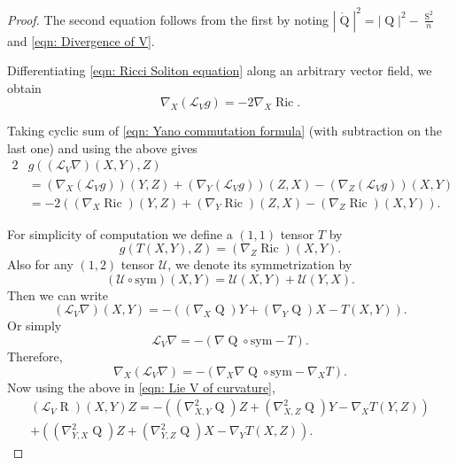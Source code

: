 \documentclass{amsart}
\newcommand{\abs}[1]{\left| #1 \right|}
\newcommand{\lie}[1]{\mathcal{L}_{#1}}
\DeclareMathOperator*{\ricci}{Ric}
\DeclareMathOperator*{\Qricci}{Q}
\DeclareMathOperator*{\scalar}{S}
\DeclareMathOperator*{\curvature}{R}
\theoremstyle{plain}
\theoremstyle{plain}
\theoremstyle{plain}
\theoremstyle{plain}
\theoremstyle{remark}
\begin{document}
\begin{proof}
The second equation follows from the first by noting $\abs{\mathring{\Qricci}}^2 = \abs{\Qricci}^2 - \frac{\scalar^2}{n} $ and \cref{eqn: Divergence of V}.

Differentiating \cref{eqn: Ricci Soliton equation} along an arbitrary vector field, we obtain 
\begin{equation*}
    \nabla_X \left( \lie{V} g \right) = - 2 \nabla_X \ricci.
\end{equation*}

Taking cyclic sum of \cref{eqn: Yano commutation formula} (with subtraction on the last one) and using the above gives
\begin{align*}
     2 & g\left( \left( \lie{V}\nabla  \right)  (X,Y), Z \right) \\
        &= \left( \nabla_X \left( \lie{V} g \right) \right) (Y,Z) + \left( \nabla_Y \left( \lie{V} g \right) \right) (Z,X)
            - \left( \nabla_Z \left( \lie{V} g \right) \right) (X,Y) \\
        &= -2 \left( \left( \nabla_X \ricci \right) (Y,Z) + \left( \nabla_Y \ricci \right) (Z,X) - \left( \nabla_Z \ricci \right) (X,Y) \right).
\end{align*}

For simplicity of computation we define a $(1,1)$ tensor $T$ by
\begin{equation*}
    g ( T(X,Y) , Z ) = (\nabla_Z \ricci ) (X,Y).
\end{equation*}
Also for any $(1,2)$ tensor $\mathcal{U}$, we denote its symmetrization by
\begin{equation*}  
 (\mathcal{U} \circ \mathrm{sym}  ) (X,Y) = \mathcal{U}(X,Y) + \mathcal{U}(Y,X).
\end{equation*} 
Then we can write
\begin{equation*}
	\left( \lie{V}\nabla \right) (X,Y) = - \left( (\nabla_X \Qricci ) Y + (\nabla_Y \Qricci) X - T (X,Y) \right).
\end{equation*}
Or simply
\begin{equation*}
	\lie{V}\nabla = - \left( \nabla\Qricci \circ \mathrm{sym} - T \right).
\end{equation*}
Therefore,
\begin{equation*}
    \nabla_X \left( \lie{V}\nabla \right) 
    		= - \left( \nabla_X \nabla\Qricci \circ \mathrm{sym} - \nabla_X T \right) .
\end{equation*}
Now using the above in \cref{eqn: Lie V of curvature},
\begin{multline*}
    (\lie{V}\curvature) (X,Y) Z = 
        - \left( \left( \nabla^2_{X,Y}\Qricci \right) Z 
        + \left( \nabla^2_{X,Z}\Qricci \right) Y - \nabla_X T (Y,Z)  \right) \\
        + \left( \left( \nabla^2_{Y,X}\Qricci \right) Z 
        + \left( \nabla^2_{Y,Z}\Qricci \right) X - \nabla_Y T (X,Z)   \right). 
\end{multline*}


\end{proof}
\end{document}
